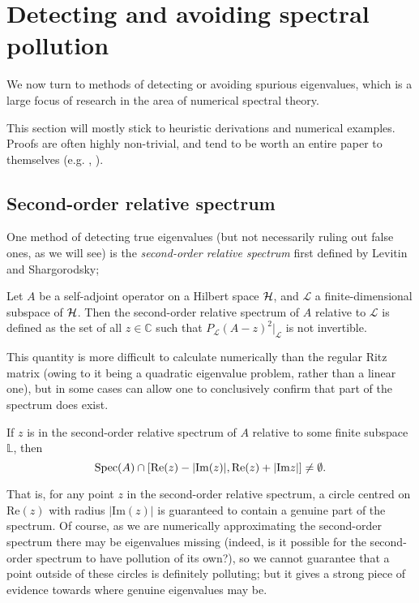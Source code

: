 \documentclass[../main.tex]{subfiles}
\begin{document}
\section{Detecting and avoiding spectral pollution}

We now turn to methods of detecting or
avoiding spurious eigenvalues, which is a large focus of research in the area of
numerical spectral theory.

This section will mostly stick to heuristic derivations and numerical examples.
Proofs are often highly non-trivial, and tend to be worth an entire paper to
themselves (e.g. \cite{soussi2006convergence}, \cite{stepanenko2022spectral}).

\subsection{Second-order relative spectrum}
One method of detecting true eigenvalues (but not necessarily ruling out false ones,
as we will see) is the \emph{second-order relative spectrum} first defined by Levitin and Shargorodsky;

\begin{definition}
  Let $A$ be a self-adjoint operator on a Hilbert space $\mathcal{H}$, and 
  $\mathcal{L}$ a finite-dimensional subspace of $\mathcal{H}$. Then the second-order relative
  spectrum of $A$ relative to $\mathcal{L}$ is defined as the set of all $z \in \mathbb{C}$
  such that $P_{\mathcal{L}}(A - z)^2\big|_{\mathcal{L}}$ is not invertible.
\end{definition}

This quantity is more difficult to calculate numerically than the regular Ritz matrix (owing to
it being a quadratic eigenvalue problem, rather than a linear one), but in some cases can allow
one to conclusively confirm that part of the spectrum does exist.

\begin{theorem}
  If $z$ is in the second-order relative spectrum of $A$ relative to some finite subspace $\mathbb{L}$,
  then
    $$\mathrm{Spec}(A) \cap [\mathrm{Re}(z) - |\mathrm{Im}(z)|, \mathrm{Re}(z) + |\mathrm{Im}z|] 
    \neq \emptyset.$$
\end{theorem}

That is, for any point $z$ in the second-order relative spectrum,
a circle centred on $\mathrm{Re}(z)$ with radius $|\mathrm{Im}(z)|$ is guaranteed to contain
a genuine part of the spectrum. Of course, as we are numerically approximating the second-order
spectrum there may be eigenvalues missing (indeed, is it possible for the second-order spectrum to
have pollution of its own?), so we cannot guarantee that a point outside of these circles is
definitely polluting; but it gives a strong piece of evidence towards where genuine eigenvalues
may be.
\end{document}
